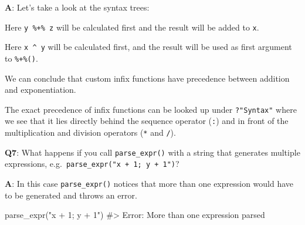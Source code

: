 \documentclass[
]{krantz}
\makeatletter
\newenvironment{Shaded}{\begin{snugshade}}{\end{snugshade}}
\newcommand{\CommentTok}[1]{\textcolor[rgb]{0.56,0.35,0.01}{\textit{#1}}}
\newcommand{\KeywordTok}[1]{\textcolor[rgb]{0.13,0.29,0.53}{\textbf{#1}}}
\newcommand{\NormalTok}[1]{#1}
\newcommand{\OperatorTok}[1]{\textcolor[rgb]{0.81,0.36,0.00}{\textbf{#1}}}
\newcommand{\StringTok}[1]{\textcolor[rgb]{0.31,0.60,0.02}{#1}}
\newenvironment{kframe}{%
\medskip{}
\setlength{\fboxsep}{.8em}
 \def\at@end@of@kframe{}%
 \ifinner\ifhmode%
  \def\at@end@of@kframe{\end{minipage}}%
  \begin{minipage}{\columnwidth}%
 \fi\fi%
 \def\FrameCommand##1{\hskip\@totalleftmargin \hskip-\fboxsep
 \colorbox{shadecolor}{##1}\hskip-\fboxsep
     \hskip-\linewidth \hskip-\@totalleftmargin \hskip\columnwidth}%
 \MakeFramed {\advance\hsize-\width
   \@totalleftmargin\z@ \linewidth\hsize
   \@setminipage}}%
 {\par\unskip\endMakeFramed%
 \at@end@of@kframe}
\renewenvironment{Shaded}{\begin{kframe}}{\end{kframe}}
\renewcommand{\KeywordTok} [1]{\textcolor[rgb]{0.00,0.44,0.13}{{#1}}}
\renewcommand{\StringTok}  [1]{\textcolor[rgb]{0.25,0.44,0.63}{{#1}}}
\renewcommand{\CommentTok} [1]{\textcolor[rgb]{0.38,0.63,0.69}{{#1}}}
\renewcommand{\NormalTok}  [1]{{#1}}
\makeatother
\begin{document}
\textbf{{A}}: Let's take a look at the syntax trees:

\begin{Shaded}
\end{Shaded}

Here \texttt{y\ \%+\%\ z} will be calculated first and the result will be added to \texttt{x}.

\begin{Shaded}
\end{Shaded}

Here \texttt{x\ \^{}\ y} will be calculated first, and the result will be used as first argument to \texttt{\%+\%()}.

We can conclude that custom infix functions have precedence between addition and exponentiation.

The exact precedence of infix functions can be looked up under \texttt{?"Syntax"} where we see that it lies directly behind the sequence operator (\texttt{:}) and in front of the multiplication and division operators (\texttt{*} and \texttt{/}).

\textbf{{Q7}}: What happens if you call \texttt{parse\_expr()} with a string that generates multiple expressions, e.g.~\texttt{parse\_expr("x\ +\ 1;\ y\ +\ 1")}?

\textbf{{A}}: In this case \texttt{parse\_expr()} notices that more than one expression would have to be generated and throws an error.

\begin{Shaded}
\begin{Highlighting}[]
\KeywordTok{parse_expr}\NormalTok{(}\StringTok{"x + 1; y + 1"}\NormalTok{)}
\CommentTok{#> Error: More than one expression parsed}
\end{Highlighting}
\end{Shaded}
\end{document}

